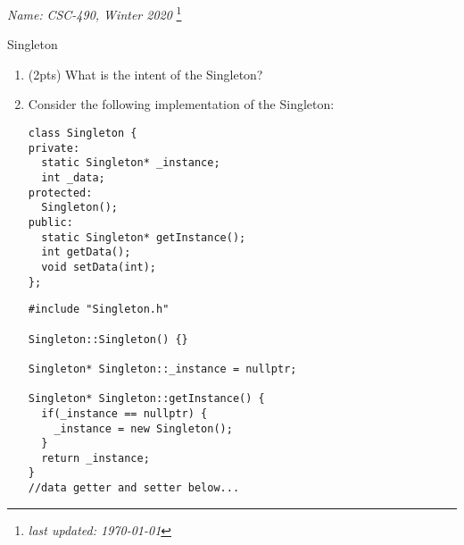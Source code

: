 \documentclass[11pt]{article}
\newlength{\up}\setlength{\up}{-\baselineskip}
\newcommand\blfootnote[1]{%
  \begingroup
  \renewcommand\thefootnote{}\footnote{#1}%
  \addtocounter{footnote}{-1}%
  \endgroup
}
\begin{document}
\noindent\emph{Name:}
\hfill
\emph{CSC-490, Winter 2020}
\blfootnote{\emph{last updated: \today}}

\vspace{-0.4in}

\begin{center}
  {\huge Singleton}
\end{center}

\medskip




\begin{enumerate}

  \item (2pts) What is the intent of the Singleton?

  \vspace{0.75in}

  \item Consider the following implementation of the Singleton:

  \begin{minipage}[b]{0.45\textwidth}
\begin{tcolorbox}[title=Singleton.h]
  \begin{verbatim}
class Singleton {
private:
  static Singleton* _instance;
  int _data;
protected:
  Singleton();
public:
  static Singleton* getInstance();
  int getData();
  void setData(int);
};
\end{verbatim}
\end{tcolorbox}
\end{minipage}
\indent
\begin{minipage}[b]{0.5\textwidth}
\begin{tcolorbox}[title=Singleton.cpp]
  \begin{verbatim}
#include "Singleton.h"

Singleton::Singleton() {}

Singleton* Singleton::_instance = nullptr;

Singleton* Singleton::getInstance() {
  if(_instance == nullptr) {
    _instance = new Singleton();
  }
  return _instance;
}
//data getter and setter below...
\end{verbatim}
\end{tcolorbox}
\end{minipage}

\begin{enumerate}


\end{enumerate}
\end{enumerate}
\end{document}
